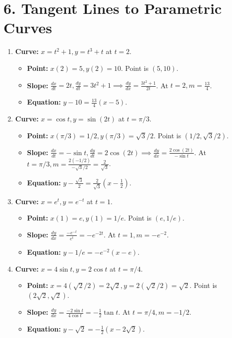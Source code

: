 \documentclass[12pt]{article}
\newcommand{\problemsettitle}[1]{\section*{#1}}
\begin{document}
\newpage
\problemsettitle{6. Tangent Lines to Parametric Curves}
\begin{enumerate}
    \item \textbf{Curve:} $x=t^2+1, y=t^3+t$ at $t=2$.
    \begin{itemize}
        \item \textbf{Point:} $x(2)=5, y(2)=10$. Point is $(5,10)$.
        \item \textbf{Slope:} $\frac{dx}{dt}=2t, \frac{dy}{dt}=3t^2+1 \implies \frac{dy}{dx}=\frac{3t^2+1}{2t}$. At $t=2, m=\frac{13}{4}$.
        \item \textbf{Equation:} $y-10=\frac{13}{4}(x-5)$.
    \end{itemize}

    \item \textbf{Curve:} $x=\cos t, y=\sin(2t)$ at $t=\pi/3$.
    \begin{itemize}
        \item \textbf{Point:} $x(\pi/3)=1/2, y(\pi/3)=\sqrt{3}/2$. Point is $(1/2, \sqrt{3}/2)$.
        \item \textbf{Slope:} $\frac{dx}{dt}=-\sin t, \frac{dy}{dt}=2\cos(2t) \implies \frac{dy}{dx}=\frac{2\cos(2t)}{-\sin t}$. At $t=\pi/3, m=\frac{2(-1/2)}{-\sqrt{3}/2}=\frac{2}{\sqrt{3}}$.
        \item \textbf{Equation:} $y-\frac{\sqrt{3}}{2}=\frac{2}{\sqrt{3}}(x-\frac{1}{2})$.
    \end{itemize}

    \item \textbf{Curve:} $x=e^t, y=e^{-t}$ at $t=1$.
    \begin{itemize}
        \item \textbf{Point:} $x(1)=e, y(1)=1/e$. Point is $(e, 1/e)$.
        \item \textbf{Slope:} $\frac{dy}{dx}=\frac{-e^{-t}}{e^t}=-e^{-2t}$. At $t=1, m=-e^{-2}$.
        \item \textbf{Equation:} $y-1/e = -e^{-2}(x-e)$.
    \end{itemize}
    
    \item \textbf{Curve:} $x=4\sin t, y=2\cos t$ at $t=\pi/4$.
    \begin{itemize}
        \item \textbf{Point:} $x=4(\sqrt{2}/2)=2\sqrt{2}, y=2(\sqrt{2}/2)=\sqrt{2}$. Point is $(2\sqrt{2}, \sqrt{2})$.
        \item \textbf{Slope:} $\frac{dy}{dx}=\frac{-2\sin t}{4\cos t}=-\frac{1}{2}\tan t$. At $t=\pi/4, m=-1/2$.
        \item \textbf{Equation:} $y-\sqrt{2}=-\frac{1}{2}(x-2\sqrt{2})$.
    \end{itemize}


\end{enumerate}
\end{document}
